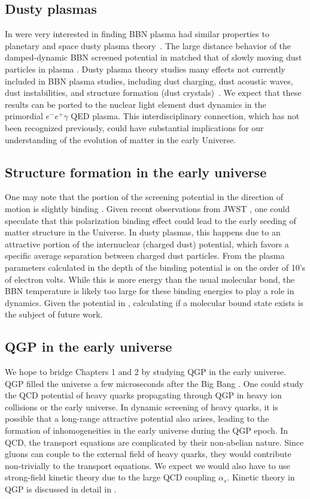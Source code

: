 \subsection{Dusty plasmas}
In \citep{Grayson:2023flr} were very interested in finding BBN plasma had similar properties to planetary and space dusty plasma theory~\citep{Montgomery:1970jpp, Stenflo:1973, Shukla:2002ppcf, Lampe:2000pop}. The large distance behavior of the damped-dynamic BBN screened potential in  matched that of slowly moving dust particles in plasma \citep{Stenflo:1973}. Dusty plasma theory studies many effects not currently included in BBN plasma studies, including dust charging, dust acoustic waves, dust instabilities, and structure formation (dust crystals)~\citep{Shukla:2002ppcf}. We expect that these results can be ported to the nuclear light element dust dynamics in the primordial $e^-e^+\gamma$ QED plasma. This interdisciplinary connection, which has not been recognized previously, could have substantial implications for our understanding of the evolution of matter in the early Universe.

\subsection{Structure formation in the early universe}
One may note that the portion of the screening potential in the direction of motion is slightly binding .
Given recent observations from JWST \citep{ferreira2023jwst}, one could speculate that this polarization binding effect could lead to the early seeding of matter structure in the Universe. In dusty plasmas, this happens due to an attractive portion of the internuclear (charged dust) potential, which favors a specific average separation between charged dust particles. From the plasma parameters calculated in \cite{Grayson:2023flr} the depth of the binding potential is on the order of 10's of electron volts. While this is more energy than the usual molecular bond, the BBN temperature is likely too large for these binding energies to play a role in dynamics. Given the potential in , calculating if a molecular bound state exists is the subject of future work.
\subsection{QGP in the early universe}
We hope to bridge Chapters 1 and 2 by studying QGP in the early universe. QGP filled the universe a few microseconds after the Big Bang \citep{rafelski2013connecting}. One could study the QCD potential of heavy quarks propagating through QGP in heavy ion collisions or the early universe. In dynamic screening of heavy quarks, it is possible that a long-range attractive potential also arises, leading to the formation of inhomogeneities in the early universe during the QGP epoch. In QCD, the transport equations are complicated by their non-abelian nature. Since gluons can couple to the external field of heavy quarks, they would contribute non-trivially to the transport equations. We expect we would also have to use strong-field kinetic theory due to the large QCD coupling $\alpha_s$. Kinetic theory in QGP is discussed in detail in \citep{MROWCZYNSKI20171}.

